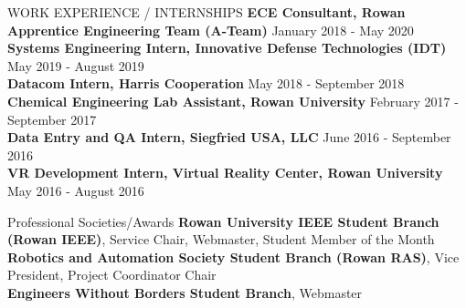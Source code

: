 \documentclass{article}
\begin{document}

\begin{rSection}{WORK EXPERIENCE / INTERNSHIPS} \itemsep -3pt
  \textbf{ECE Consultant, Rowan Apprentice Engineering Team (A-Team)} \hfill January 2018 - May 2020\\
  \textbf{Systems Engineering Intern, Innovative Defense Technologies (IDT)} \hfill May 2019 - August 2019\\
  \textbf{Datacom Intern, Harris Cooperation} \hfill May 2018 - September 2018\\
  \textbf{Chemical Engineering Lab Assistant, Rowan University} \hfill February 2017 - September 2017\\
  \textbf{Data Entry and QA Intern, Siegfried USA, LLC} \hfill June 2016 - September 2016\\
  \textbf{VR Development Intern, Virtual Reality Center, Rowan University} \hfill May 2016 - August 2016
\end{rSection}

\begin{rSection}{Professional Societies/Awards} \itemsep -3pt
  {\textbf{Rowan University IEEE Student Branch (Rowan IEEE)}, Service Chair,
  Webmaster, Student Member of the Month}\\
  {\textbf{Robotics and Automation Society Student Branch (Rowan RAS)}, Vice President, Project Coordinator Chair}\\
  {\textbf{Engineers Without Borders Student Branch}, Webmaster}
\end{rSection}
\end{document}
